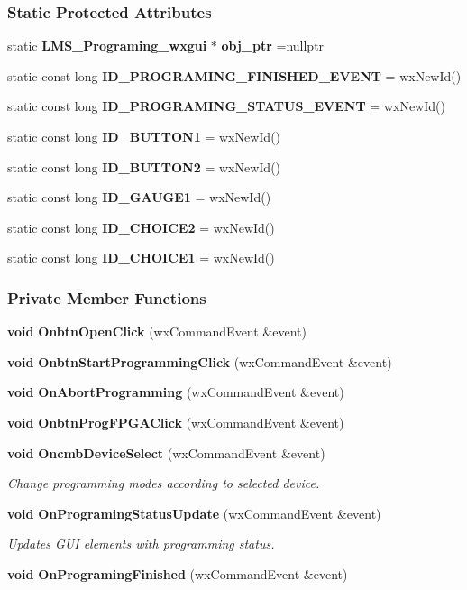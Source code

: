 \subsubsection*{Static Protected Attributes}
\begin{DoxyCompactItemize}
\item 
static {\bf L\+M\+S\+\_\+\+Programing\+\_\+wxgui} $\ast$ {\bf obj\+\_\+ptr} =nullptr
\item 
static const long {\bf I\+D\+\_\+\+P\+R\+O\+G\+R\+A\+M\+I\+N\+G\+\_\+\+F\+I\+N\+I\+S\+H\+E\+D\+\_\+\+E\+V\+E\+NT} = wx\+New\+Id()
\item 
static const long {\bf I\+D\+\_\+\+P\+R\+O\+G\+R\+A\+M\+I\+N\+G\+\_\+\+S\+T\+A\+T\+U\+S\+\_\+\+E\+V\+E\+NT} = wx\+New\+Id()
\item 
static const long {\bf I\+D\+\_\+\+B\+U\+T\+T\+O\+N1} = wx\+New\+Id()
\item 
static const long {\bf I\+D\+\_\+\+B\+U\+T\+T\+O\+N2} = wx\+New\+Id()
\item 
static const long {\bf I\+D\+\_\+\+G\+A\+U\+G\+E1} = wx\+New\+Id()
\item 
static const long {\bf I\+D\+\_\+\+C\+H\+O\+I\+C\+E2} = wx\+New\+Id()
\item 
static const long {\bf I\+D\+\_\+\+C\+H\+O\+I\+C\+E1} = wx\+New\+Id()
\end{DoxyCompactItemize}
\subsubsection*{Private Member Functions}
\begin{DoxyCompactItemize}
\item 
{\bf void} {\bf Onbtn\+Open\+Click} (wx\+Command\+Event \&event)
\item 
{\bf void} {\bf Onbtn\+Start\+Programming\+Click} (wx\+Command\+Event \&event)
\item 
{\bf void} {\bf On\+Abort\+Programming} (wx\+Command\+Event \&event)
\item 
{\bf void} {\bf Onbtn\+Prog\+F\+P\+G\+A\+Click} (wx\+Command\+Event \&event)
\item 
{\bf void} {\bf Oncmb\+Device\+Select} (wx\+Command\+Event \&event)
\begin{DoxyCompactList}\small\item\em Change programming modes according to selected device. \end{DoxyCompactList}\item 
{\bf void} {\bf On\+Programing\+Status\+Update} (wx\+Command\+Event \&event)
\begin{DoxyCompactList}\small\item\em Updates G\+UI elements with programming status. \end{DoxyCompactList}\item 
{\bf void} {\bf On\+Programing\+Finished} (wx\+Command\+Event \&event)
\end{DoxyCompactItemize}


